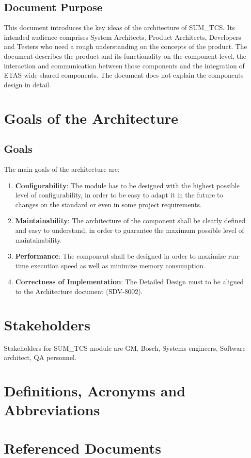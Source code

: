\subsection{Document Purpose}

This document introduces the key ideas of the architecture of SUM_TCS.
Its intended audience comprises System Architects, Product Architects, Developers and Testers who need a rough understanding on the concepts of the product.
The document describes the product and its functionality on the component level, the interaction and communication between those components and the integration of ETAS wide shared components.
The document does not explain the components design in detail.

\section{Goals of the Architecture}

\subsection{Goals}

The main goals of the architecture are:

\begin{enumerate}
\item \textbf{Configurability}: The module has to be designed with the highest possible level of configurability, in order to be easy to adapt it in the future to changes on the standard or even in some project requirements.
\item \textbf{Maintainability}: The architecture of the component shall be clearly defined and easy to understand, in order to guarantee the maximum possible level of maintainability.
\item \textbf{Performance}: The component shall be designed in order to maximize run-time execution speed as well as minimize memory consumption.
\item \textbf{Correctness of Implementation}: The Detailed Design must to be aligned to the Architecture document (SDV-8002).
\end{enumerate}

\section{Stakeholders}

Stakeholders for SUM_TCS module are GM, Bosch, Systems engineers, Software architect, QA personnel.

\section{Definitions, Acronyms and Abbreviations}



\section{Referenced Documents}

